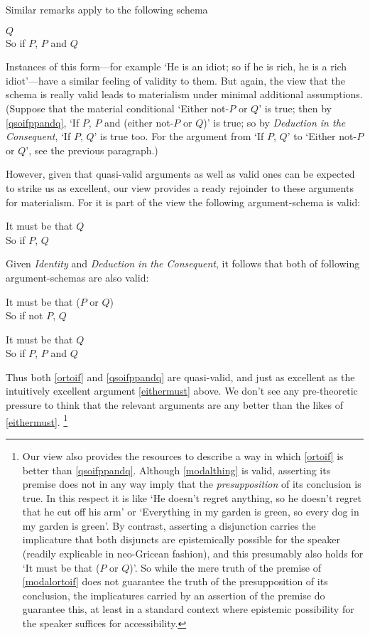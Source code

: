 \documentclass[If.tex]{subfiles}
\begin{document}
Similar remarks apply to the following schema
\begin{prop}
	 \label{qsoifppandq}
	\parbox[t]{\linewidth}{$Q$\\
	So if $P$, $P$ and $Q$}
\end{prop}
Instances of this form---for example ‘He is an idiot; so if he is rich, he is a rich idiot’---have a similar feeling of validity to them.  But again, the view that the schema is really valid leads to materialism under minimal additional assumptions.  (Suppose that the material conditional ‘Either not-$P$ or $Q$’ is true; then by \ref{qsoifppandq}, ‘If $P$, $P$ and (either not-$P$ or $Q$)’ is true; so by \emph{Deduction in the Consequent}, ‘If $P$, $Q$’ is true too.  For the argument from ‘If $P$, $Q$’ to ‘Either not-$P$ or $Q$’, see the previous paragraph.)

However, given that quasi-valid arguments as well as valid ones can be expected to strike us as excellent, our view provides a ready rejoinder to these arguments for materialism. For it is part of the view the following argument-schema is valid:
\begin{prop}
	\sitem[Must-if] \label{mustif}
	\parbox[t]{\linewidth}{It must be that $Q$\\
	So if $P$, $Q$}
\end{prop}
Given \emph{Identity} and \emph{Deduction in the Consequent}, it follows that both of following argument-schemas are also valid:
\begin{prop}
	\sitem[Modalised Or-to-if] \label{modalortoif}
	\parbox[t]{\linewidth}{It must be that ($P$ or $Q$)\\
	So if not $P$, $Q$}
	 \label{modalthing}
	\parbox[t]{\linewidth}{It must be that $Q$\\
	So if $P$, $P$ and $Q$}
\end{prop}
Thus both \ref{ortoif} and \ref{qsoifppandq} are quasi-valid, and just as excellent as the intuitively excellent argument \ref{eithermust} above. We don't see any pre-theoretic pressure to think that the relevant arguments are any better than the likes of \ref{eithermust}.%
\footnote{Our view also provides the resources to describe a way in which \ref{ortoif} is better than \ref{qsoifppandq}.  Although \ref{modalthing} is valid, asserting its premise does not in any way imply that the \emph{presupposition} of its conclusion is true.  In this respect it is like ‘He doesn't regret anything, so he doesn't regret that he cut off his arm’ or ‘Everything in my garden is green, so every dog in my garden is green’.  By contrast, asserting a disjunction carries the implicature that both disjuncts are epistemically possible for the speaker (readily explicable in neo-Gricean fashion), and this presumably also holds for ‘It must be that ($P$ or $Q$)’.  So while the mere truth of the premise of \ref{modalortoif} does not guarantee the truth of the presupposition of its conclusion, the implicatures carried by an assertion of the premise do guarantee this, at least in a standard context where epistemic possibility for the speaker suffices for accessibility.}
\end{document}
